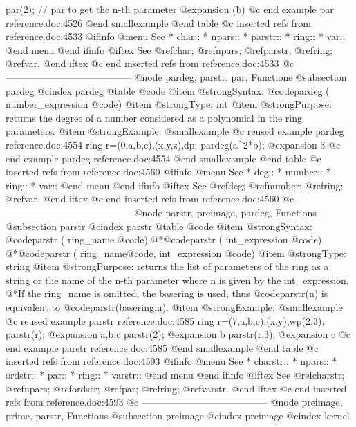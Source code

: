 {  par(2);   // par to get the n-th parameter
@expansion{} (b)
@c end example par reference.doc:4526
@end smallexample
@end table
@c inserted refs from reference.doc:4533
@ifinfo
@menu
See
* char::
* npars::
* parstr::
* ring::
* var::
@end menu
@end ifinfo
@iftex
See
@ref{char};
@ref{npars};
@ref{parstr};
@ref{ring};
@ref{var}.
@end iftex
@c end inserted refs from reference.doc:4533
@c ---------------------------------------
@node pardeg, parstr, par, Functions
@subsection pardeg
@cindex pardeg
@table @code
@item @strong{Syntax:}
@code{pardeg (} number_expression @code{)}
@item @strong{Type:}
int
@item @strong{Purpose:}
returns the degree of a number considered as a polynomial in the ring parameters.
@item @strong{Example:}
@smallexample
@c reused example pardeg reference.doc:4554 
  ring r=(0,a,b,c),(x,y,z),dp;
  pardeg(a^2*b);
@expansion{} 3
@c end example pardeg reference.doc:4554
@end smallexample
@end table
@c inserted refs from reference.doc:4560
@ifinfo
@menu
See
* deg::
* number::
* ring::
* var::
@end menu
@end ifinfo
@iftex
See
@ref{deg};
@ref{number};
@ref{ring};
@ref{var}.
@end iftex
@c end inserted refs from reference.doc:4560
@c ---------------------------------------
@node parstr, preimage, pardeg, Functions
@subsection parstr
@cindex parstr
@table @code
@item @strong{Syntax:}
@code{parstr (} ring_name @code{)}
@*@code{parstr (} int_expression @code{)}
@*@code{parstr (} ring_name@code{,} int_expression @code{)}
@item @strong{Type:}
string
@item @strong{Purpose:}
returns the list of parameters of the ring as a string
or the name of the n-th parameter where n is given by the int_expression.
@*If the ring_name is omitted, the basering is used, thus
@code{parstr(n)} is equivalent to @code{parstr(basering,n)}.
@item @strong{Example:}
@smallexample
@c reused example parstr reference.doc:4585 
  ring r=(7,a,b,c),(x,y),wp(2,3);
  parstr(r);
@expansion{} a,b,c
  parstr(2);
@expansion{} b
  parstr(r,3);
@expansion{} c
@c end example parstr reference.doc:4585
@end smallexample
@end table
@c inserted refs from reference.doc:4593
@ifinfo
@menu
See
* charstr::
* npars::
* ordstr::
* par::
* ring::
* varstr::
@end menu
@end ifinfo
@iftex
See
@ref{charstr};
@ref{npars};
@ref{ordstr};
@ref{par};
@ref{ring};
@ref{varstr}.
@end iftex
@c end inserted refs from reference.doc:4593
@c ---------------------------------------
@node preimage, prime, parstr, Functions
@subsection preimage
@cindex preimage
@cindex kernel

}
